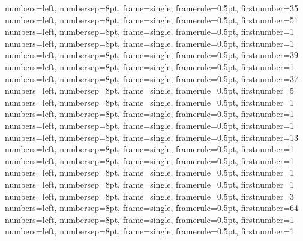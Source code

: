 {numbers=left, numbersep=8pt, frame=single, framerule=0.5pt, firstnumber=35}
{numbers=left, numbersep=8pt, frame=single, framerule=0.5pt, firstnumber=51}
{numbers=left, numbersep=8pt, frame=single, framerule=0.5pt, firstnumber=1}
{numbers=left, numbersep=8pt, frame=single, framerule=0.5pt, firstnumber=1}
{numbers=left, numbersep=8pt, frame=single, framerule=0.5pt, firstnumber=39}
{numbers=left, numbersep=8pt, frame=single, framerule=0.5pt, firstnumber=1}
{numbers=left, numbersep=8pt, frame=single, framerule=0.5pt, firstnumber=37}
{numbers=left, numbersep=8pt, frame=single, framerule=0.5pt, firstnumber=5}
{numbers=left, numbersep=8pt, frame=single, framerule=0.5pt, firstnumber=1}
{numbers=left, numbersep=8pt, frame=single, framerule=0.5pt, firstnumber=1}
{numbers=left, numbersep=8pt, frame=single, framerule=0.5pt, firstnumber=1}
{numbers=left, numbersep=8pt, frame=single, framerule=0.5pt, firstnumber=13}
{numbers=left, numbersep=8pt, frame=single, framerule=0.5pt, firstnumber=1}
{numbers=left, numbersep=8pt, frame=single, framerule=0.5pt, firstnumber=1}
{numbers=left, numbersep=8pt, frame=single, framerule=0.5pt, firstnumber=1}
{numbers=left, numbersep=8pt, frame=single, framerule=0.5pt, firstnumber=1}
{numbers=left, numbersep=8pt, frame=single, framerule=0.5pt, firstnumber=3}
{numbers=left, numbersep=8pt, frame=single, framerule=0.5pt, firstnumber=64}
{numbers=left, numbersep=8pt, frame=single, framerule=0.5pt, firstnumber=1}
{numbers=left, numbersep=8pt, frame=single, framerule=0.5pt, firstnumber=1}